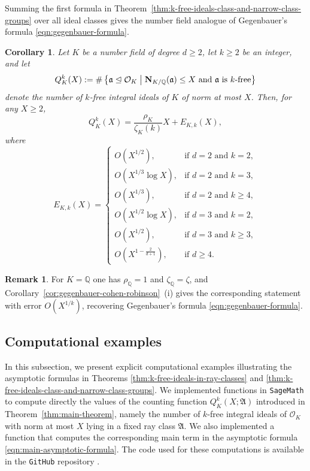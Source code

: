 \documentclass[11pt, reqno]{amsart}
\numberwithin{equation}{section}
\newtheorem{corollary}[theorem]{Corollary}
\newcommand{\suchthat}{\;\ifnum\currentgrouptype=16 \middle\fi|\;}
\newcommand{\Q}{\mathbb{Q}}
\newcommand{\Nrm}[2]{\mathbf{N}_{#1}(#2)}
\theoremstyle{definition}
\newtheorem{remark}[theorem]{Remark}
\begin{document}
Summing the first formula in
Theorem~\ref{thm:k-free-ideals-class-and-narrow-class-groups} over all ideal
classes gives the number field analogue of Gegenbauer's formula
\eqref{eqn:gegenbauer-formula}.

\begin{corollary}\label{cor:gegenbauer-number-field}
Let $K$ be a number field of degree $d\geq2$, let $k\geq2$ be an integer, and let
\[
Q_K^k(X)
:=
\#\left\{
\mathfrak{a}\trianglelefteq\mathcal{O}_K
\suchthat
\Nrm{K/\Q}{\mathfrak{a}}\leq X
\text{ and }
\mathfrak{a}\text{ is $k$-free}
\right\}
\]
denote the number of $k$-free integral ideals of $K$ of norm at most $X$. Then,
for any $X\geq2$,
\[
Q_K^k(X)
=
\frac{\rho_K}{\zeta_K(k)}X
+
E_{K,k}(X),
\]
where
\[
E_{K,k}(X)
=
\begin{cases}
O\left(X^{1/2}\right), & \text{if } d=2 \text{ and } k=2,\\[4pt]
O\left(X^{1/3}\log X\right), & \text{if } d=2 \text{ and } k=3,\\[4pt]
O\left(X^{1/3}\right), & \text{if } d=2 \text{ and } k\geq4,\\[4pt]
O\left(X^{1/2}\log X\right), & \text{if } d=3 \text{ and } k=2,\\[4pt]
O\left(X^{1/2}\right), & \text{if } d=3 \text{ and } k\geq3,\\[4pt]
O\left(X^{1-\frac{2}{d+1}}\right), & \text{if } d\geq4.
\end{cases}
\]
\end{corollary}



\begin{remark}
For $K=\Q$ one has $\rho_{\Q}=1$ and $\zeta_{\Q}=\zeta$, and
Corollary~\ref{cor:gegenbauer-cohen-robinson}~(i) gives the corresponding
statement with error $O(X^{1/k})$, recovering Gegenbauer's formula
\eqref{eqn:gegenbauer-formula}.
\end{remark}





\subsection{Computational examples}


In this subsection, we present explicit computational examples illustrating the asymptotic formulas in Theorems \ref{thm:k-free-ideals-in-ray-classes} and \ref{thm:k-free-ideals-class-and-narrow-class-groups}. We implemented functions in \texttt{SageMath} \cite{SageMathCoCalc} to compute directly the values of the counting function $Q_K^{k}(X;\mathfrak{A})$ introduced in Theorem~\ref{thm:main-theorem}, namely the number of $k$-free integral ideals of $\mathcal{O}_K$ with norm at most $X$ lying in a fixed ray class $\mathfrak{A}$. We also implemented a function that computes the corresponding main term in the asymptotic formula \eqref{eqn:main-asymptotic-formula}. The code used for these computations is available in the \texttt{GitHub} repository \cite{k-free-ideals-code}.
\end{document}
